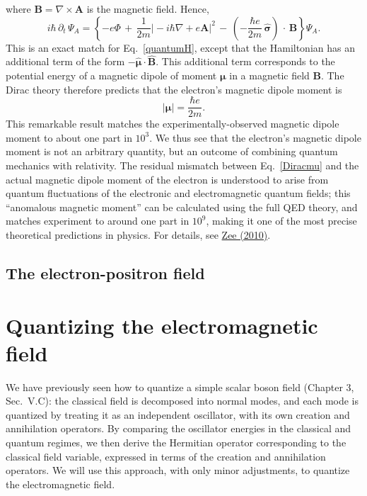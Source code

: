 \documentclass[pra,12pt]{revtex4}
\begin{document}
where $\mathbf{B} = \nabla\times\mathbf{A}$ is the magnetic field.
Hence,
\begin{equation}
  i\hbar\, \partial_t \, \Psi_A
  = \left\{-e\Phi
  \,+\, \frac{1}{2m} \big|-i\hbar\nabla +e\mathbf{A} \big|^2
  \,-\, \left(-\frac{\hbar e}{2m}\, \hat{\boldsymbol{\sigma}}\right)
  \,\cdot\, \mathbf{B} \right\} \Psi_A.
\end{equation}
This is an exact match for Eq.~\eqref{quantumH}, except that the
Hamiltonian has an additional term of the form $-
\hat{\boldsymbol{\mu}} \cdot \hat{\mathbf{B}}$.  This additional term
corresponds to the potential energy of a magnetic dipole of moment
$\boldsymbol{\mu}$ in a magnetic field $\mathbf{B}$.  The Dirac theory
therefore predicts that the electron's magnetic dipole moment is
\begin{equation}
  |\boldsymbol{\mu}| = \frac{\hbar e}{2m}.
  \label{Diracmu}
\end{equation}
This remarkable result matches the experimentally-observed magnetic
dipole moment to about one part in $10^3$.  We thus see that the
electron's magnetic dipole moment is not an arbitrary quantity, but an
outcome of combining quantum mechanics with relativity.  The residual
mismatch between Eq.~\eqref{Diracmu} and the actual magnetic dipole
moment of the electron is understood to arise from quantum
fluctuations of the electronic and electromagnetic quantum fields;
this ``anomalous magnetic moment'' can be calculated using the full
QED theory, and matches experiment to around one part in $10^9$,
making it one of the most precise theoretical predictions in physics.
For details, see \hyperref[cite:zee]{Zee (2010)}.

\subsection{The electron-positron field}

\section{Quantizing the electromagnetic field}

We have previously seen how to quantize a simple scalar boson field
(Chapter 3, Sec.~V.C): the classical field is decomposed into normal
modes, and each mode is quantized by treating it as an independent
oscillator, with its own creation and annihilation operators.  By
comparing the oscillator energies in the classical and quantum
regimes, we then derive the Hermitian operator corresponding to the
classical field variable, expressed in terms of the creation and
annihilation operators.  We will use this approach, with only minor
adjustments, to quantize the electromagnetic field.
\end{document}

